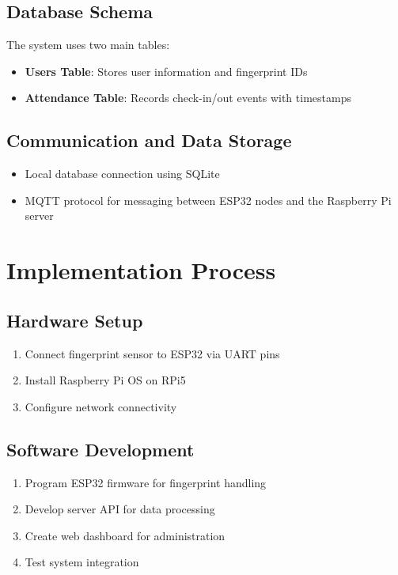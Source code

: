 \documentclass[10pt,a4paper]{article}
\begin{document}
\subsection{Database Schema}
The system uses two main tables:
\begin{itemize}
    \item \textbf{Users Table}: Stores user information and fingerprint IDs
    \item \textbf{Attendance Table}: Records check-in/out events with timestamps
\end{itemize}

\subsection{Communication and Data Storage}
\begin{itemize}
    \item Local database connection using SQLite
    \item MQTT protocol for messaging between ESP32 nodes and the Raspberry Pi server
\end{itemize}

\section{Implementation Process}

\subsection{Hardware Setup}
\begin{enumerate}
    \item Connect fingerprint sensor to ESP32 via UART pins
    \item Install Raspberry Pi OS on RPi5
    \item Configure network connectivity
\end{enumerate}

\subsection{Software Development}
\begin{enumerate}
    \item Program ESP32 firmware for fingerprint handling
    \item Develop server API for data processing
    \item Create web dashboard for administration
    \item Test system integration
\end{enumerate}
\end{document}
